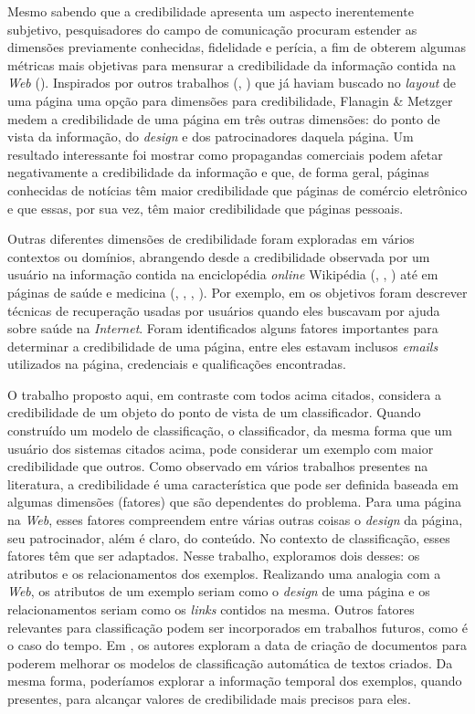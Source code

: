 Mesmo sabendo que a credibilidade apresenta um aspecto inerentemente subjetivo, pesquisadores do campo de comunicação procuram estender as dimensões previamente conhecidas, fidelidade e perícia, a fim de obterem algumas métricas mais objetivas para mensurar a credibilidade da informação contida na \textit{Web} (\cite{Flanagin07}). 
Inspirados por outros trabalhos
(\cite{Palmer00}, \cite{Fogg01})
que já haviam buscado no \textit{layout} de uma página uma opção para dimensões para credibilidade, Flanagin \& Metzger medem a credibilidade de uma página em três outras dimensões: do ponto de vista da informação, do \textit{design} e dos patrocinadores daquela página. Um resultado interessante foi mostrar como propagandas comerciais podem afetar negativamente a credibilidade da informação e que, de forma geral, páginas conhecidas de notícias têm maior credibilidade que páginas de comércio eletrônico e que essas, por sua vez, têm maior credibilidade que páginas pessoais.

Outras diferentes dimensões de credibilidade foram exploradas em vários contextos ou domínios, abrangendo desde a credibilidade observada por um usuário na informação contida na enciclopédia \textit{online} Wikipédia (\cite{Chesney06}, \cite{Lopes08}, \cite{Kubiszewski11}) até em páginas de saúde e medicina (\cite{Linderg98}, \cite{Eastin01}, \cite{Eysenbach02}, \cite{Rains09}). Por exemplo, em \cite{Eysenbach02} os objetivos foram descrever técnicas de recuperação usadas por usuários quando eles buscavam por ajuda sobre saúde na \textit{Internet}. Foram identificados alguns fatores importantes para determinar a credibilidade de uma página, entre eles estavam inclusos \textit{emails} utilizados na página, credenciais e qualificações encontradas.

O trabalho proposto aqui, em contraste com todos acima citados, considera a credibilidade de um objeto do ponto de vista de um classificador. Quando construído um modelo de classificação, o classificador, da mesma forma que um usuário dos sistemas citados acima, pode considerar um exemplo com maior credibilidade que outros. Como observado em vários trabalhos presentes na literatura, a credibilidade é uma característica que pode ser definida baseada em algumas dimensões (fatores) que são dependentes do problema. Para uma página na \textit{Web}, esses fatores compreendem entre várias outras coisas o \textit{design} da página, seu patrocinador, além é claro, do conteúdo. No contexto de classificação, esses fatores têm que ser adaptados. Nesse trabalho, exploramos dois desses: os atributos e os relacionamentos dos exemplos. Realizando uma analogia com a \textit{Web}, os atributos de um exemplo seriam como o \textit{design} de uma página e os relacionamentos seriam como os \textit{links} contidos na mesma. Outros fatores relevantes para classificação podem ser incorporados em trabalhos futuros, como é o caso do tempo. Em \cite{Salles10}, os autores exploram a data de criação de documentos para poderem melhorar os modelos de classificação automática de textos criados. Da mesma forma, poderíamos explorar a informação temporal dos exemplos, quando presentes, para alcançar valores de credibilidade mais precisos para eles. 


